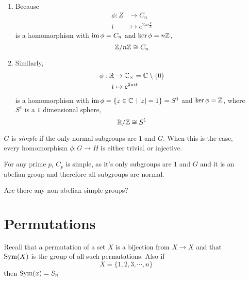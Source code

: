 \documentclass{article}
\begin{document}
\begin{eg}\leavevmode
    \begin{enumerate}
        \item Because 
        \begin{align*}
            \phi: Z &\rightarrow C_n \\
            t &\mapsto e^{2 \pi i \frac{k}{n}}
        \end{align*}
        is a homomorphism with $\operatorname{im} \phi = C_n$ and $\ker \phi = n\mathbb{Z}$,
        \[
            \mathbb{Z} / n\mathbb{Z} \cong C_n  
        \]
        \item Similarly,
        \begin{align*}
            \phi: \mathbb{R} &\rightarrow \mathbb{C}_\times = \mathbb{C} \setminus \{ 0 \}\\
            t &\mapsto e^{2 \pi i t}
        \end{align*}
        is a homomorphism with $\operatorname{im} \phi = \{ z \in \mathbb{C} \mid \left\lvert z\right\rvert = 1\} = S^1$ and $\ker \phi = \mathbb{Z}$, where $S^1$ is a $1$ dimensional sphere,
        \[
            \mathbb{R} / \mathbb{Z} \cong S^1  
        \]
    \end{enumerate}
\end{eg}
\begin{defi}[Simple]
    $G$ is \emph{simple} if the only normal subgroups are $1$ and $G$. When this is the case, every homomorphism $\phi: G \rightarrow H$ is either trivial or injective.
\end{defi}
\begin{eg}
    For any prime $p$, $C_p$ is simple, as it's only subgroups are $1$ and $G$ and it is an abelian group and therefore all subgroups are normal.
\end{eg}
\begin{question}
    Are there any non-abelian simple groups?
\end{question}

\section{Permutations}
Recall that a permutation of a set $X$ is a bijection from $X \rightarrow X$ and that $\operatorname{Sym}(X)$ is the group of all such permutations. Also if
\[
    X = \{1, 2, 3, \cdots, n\}    
\]
then $\operatorname{Sym}(x) = S_n$
\end{document}
